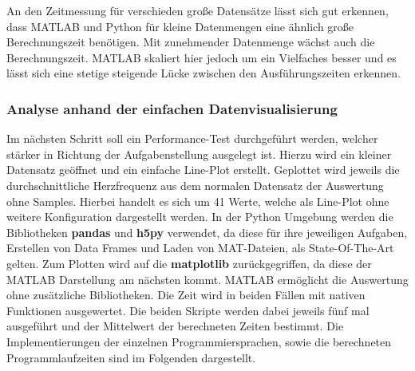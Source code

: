 An den Zeitmessung für verschieden große Datensätze lässt sich gut erkennen, dass MATLAB und Python für kleine Datenmengen eine ähnlich große Berechnungszeit benötigen. Mit zunehmender Datenmenge wächst auch die Berechnungszeit. MATLAB skaliert hier jedoch um ein Vielfaches besser und es lässt sich eine stetige steigende Lücke zwischen den Ausführungszeiten erkennen.\cite{olsMatPy}

\subsubsection{Analyse anhand der einfachen Datenvisualisierung}

Im nächsten Schritt soll ein Performance-Test durchgeführt werden, welcher stärker in Richtung der Aufgabenstellung ausgelegt ist. Hierzu wird ein kleiner Datensatz geöffnet und ein einfache Line-Plot erstellt. Geplottet wird jeweils die durchschnittliche Herzfrequenz aus dem normalen Datensatz der Auswertung ohne Samples. Hierbei handelt es sich um 41 Werte, welche als Line-Plot ohne weitere Konfiguration dargestellt werden. In der Python Umgebung werden die Bibliotheken \textbf{pandas} und \textbf{h5py} verwendet, da diese für ihre jeweiligen Aufgaben, Erstellen von Data Frames und Laden von MAT-Dateien, als State-Of-The-Art gelten. Zum Plotten wird auf die \textbf{matplotlib} zurückgegriffen, da diese der MATLAB Darstellung am nächsten kommt. MATLAB ermöglicht die Auswertung ohne zusätzliche Bibliotheken. Die Zeit wird in beiden Fällen mit nativen Funktionen ausgewertet. Die beiden Skripte werden dabei jeweils fünf mal ausgeführt und der Mittelwert der berechneten Zeiten bestimmt. Die Implementierungen der einzelnen Programmiersprachen, sowie die berechneten Programmlaufzeiten sind im Folgenden dargestellt.\cite{pandas}\cite{h5py}

\begin{minipage}{\linewidth}

\end{minipage}
\begin{minipage}{\linewidth}

\end{minipage}

